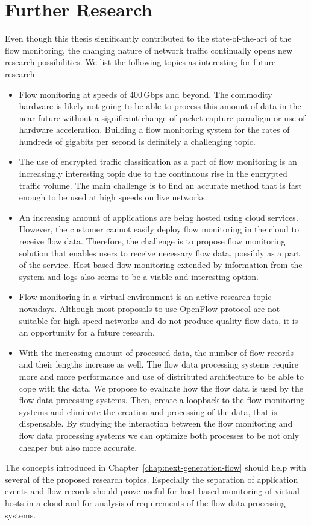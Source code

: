 \section{Further Research}

Even though this thesis significantly contributed to the state-of-the-art of the flow monitoring, the changing nature of network traffic continually opens new research possibilities. We list the following topics as interesting for future research:

\begin{itemize}
  \item Flow monitoring at speeds of 400\,Gbps and beyond. The commodity hardware is likely not going to be able to process this amount of data in the near future without a significant change of packet capture paradigm or use of hardware acceleration. Building a flow monitoring system for the rates of hundreds of gigabits per second is definitely a challenging topic.
  \item The use of encrypted traffic classification as a part of flow monitoring is an increasingly interesting topic due to the continuous rise in the encrypted traffic volume. The main challenge is to find an accurate method that is fast enough to be used at high speeds on live networks.
  \item An increasing amount of applications are being hosted using cloud services. However, the customer cannot easily deploy flow monitoring in the cloud to receive flow data. Therefore, the challenge is to propose flow monitoring solution that enables users to receive necessary flow data, possibly as a part of the service. Host-based flow monitoring extended by information from the system and logs also seems to be a viable and interesting option.
  \item Flow monitoring in a virtual environment is an active research topic nowadays. Although most proposals to use OpenFlow protocol are not suitable for high-speed networks and do not produce quality flow data, it is an opportunity for a future research.
  \item With the increasing amount of processed data, the number of flow records and their lengths increase as well. The flow data processing systems require more and more performance and use of distributed architecture to be able to cope with the data. We propose to evaluate how the flow data is used by the flow data processing systems. Then, create a loopback to the flow monitoring systems and eliminate the creation and processing of the data, that is dispensable. By studying the interaction between the flow monitoring and flow data processing systems we can optimize both processes to be not only cheaper but also more accurate.
\end{itemize}

The concepts introduced in Chapter~\ref{chap:next-generation-flow} should help with several of the proposed research topics. Especially the separation of application events and flow records should prove useful for host-based monitoring of virtual hosts in a cloud and for analysis of requirements of the flow data processing systems.